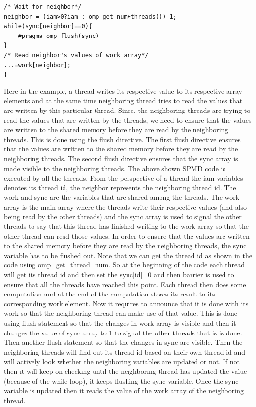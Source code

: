 \documentclass[12pt]{book}
\begin{document}
\begin{itemize}
\begin{lstlisting}[caption={Flush Directive},captionpos=b,label={lst:flush}]
/* Wait for neighbor*/
neighbor = (iam>0?iam : omp_get_num+threads())-1;
while(sync[neighbor]==0){
    #pragma omp flush(sync)
}
/* Read neighbor's values of work array*/
...=work[neighbor];
}
\end{lstlisting}
    Here in the example, a thread writes its respective value to its respective array elements and at the same time 
    neighboring thread tries to read the values that are written by this particular thread. Since, the neighboring threads are trying to read the values that are written by the threads, we need to ensure that the values are written to the shared memory before they are read by the neighboring threads.
    This is done using the flush directive. The first flush directive ensures that the values are written to the shared memory before they are read by the neighboring threads. The second flush directive ensures that the sync array is made visible to the neighboring threads.
    The above shown SPMD code is executed by all the threads. From the perspective of a thread the iam variables denotes its thread id, the neighbor represents the neighboring thread id. The 
    work and sync are the variables that are shared among the threads. The work array is the main array where the threads write their respective values (and also being read by the other threads) and the sync array is used to signal the other threads to say that this thread has finished writing to the work array
    so that the other thread can read those values. In order to ensure that the values are written to the shared memory before they are read by the neighboring threads, the sync variable has to be flushed out.
    Note that we can get the thread id as shown in the code using omp\_get\_thread\_num. So at the beginning of the code each thread will get its thread id and then set the sync[id]=0 and then barrier is used to ensure that all the threads have reached this point.
    Each thread then does some computation and at the end of the computation stores its result to its corresponding work element. Now it requires to announce that it is done with its work so that the neighboring thread can make use of that value.
    This is done using flush statement so that the changes in work array is visible and then it changes the value of sync array to 1 to signal the other threads that is is done. Then another flush statement so that the changes in sync are visible.
    Then the neighboring threads will find out its thread id based on their own thread id and will actively look whether the neighboring variables are updated or not. If not then it will keep on checking until the neighboring thread has updated the value  (because of the while loop),
    it keeps flushing the sync variable. Once the sync variable is updated then it reads the value of the work array of the neighboring thread.
\end{itemize}
\end{document}
